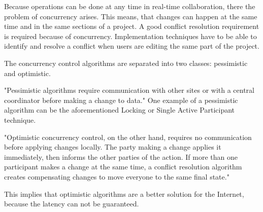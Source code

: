 \documentclass[12pt,oneside]{fithesis2}
\begin{document}
\par Because operations can be done at any time in real-time collaboration, there the problem of concurrency arises. This means, that changes can happen at the same time and in the same sections of a project. A good conflict resolution requirement is required because of concurrency. Implementation techniques have to be able to identify and resolve a conflict when users are editing the same part of the project. \par The concurrency control algorithms are separated into two classes: pessimistic and optimistic. \par "Pessimistic algorithms require communication with other sites or with a central coordinator before making a change to data." \cite{Jupiter} One example of a pessimistic algorithm can be the aforementioned Locking or Single Active Participant technique. \par "Optimistic concurrency control, on the other hand, requires no communication before applying changes locally. The party making a change applies it immediately, then informs the other parties of the action. If more than one participant makes a change at the same time, a conflict resolution algorithm creates compensating changes to move everyone to the same final state." \cite{Jupiter} \par This implies that optimistic algorithms are a better solution for the Internet, because the latency can not be guaranteed. 
\end{document}
